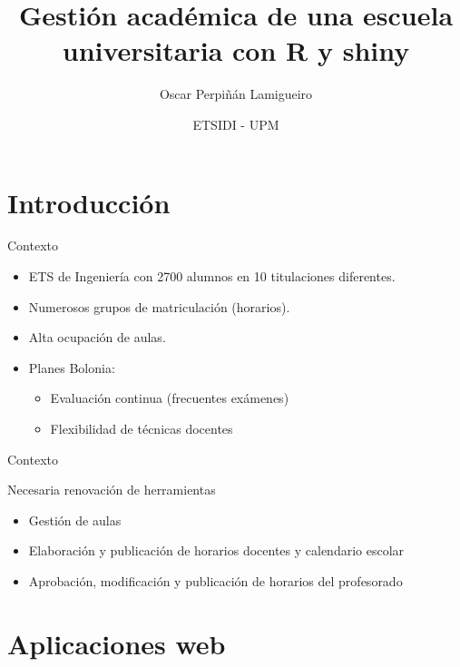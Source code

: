 \documentclass[spanish, xcolor={usenames,svgnames,dvipsnames}]{beamer}
\author{Oscar Perpiñán Lamigueiro}
\date{ETSIDI - UPM}
\title{Gestión académica de una escuela universitaria con R y shiny}
\begin{document}
\maketitle

\section{Introducción}
\label{sec:org19538d4}

\begin{frame}[label={sec:org47394fa}]{Contexto}
\begin{itemize}
\item ETS de Ingeniería con 2700 alumnos en 10 titulaciones diferentes.
\item Numerosos grupos de matriculación (horarios).
\item Alta ocupación de aulas.
\item Planes Bolonia:
\begin{itemize}
\item Evaluación continua (frecuentes exámenes)
\item Flexibilidad de técnicas docentes
\end{itemize}
\end{itemize}
\end{frame}

\begin{frame}[label={sec:org97a7d5a}]{Contexto}
\begin{block}{Necesaria renovación de herramientas}
\begin{itemize}
\item Gestión de aulas
\item Elaboración y publicación de horarios docentes y calendario escolar
\item Aprobación, modificación y publicación de horarios del profesorado
\end{itemize}
\end{block}
\end{frame}


\section{Aplicaciones web}
\label{sec:org4046b28}
\end{document}
